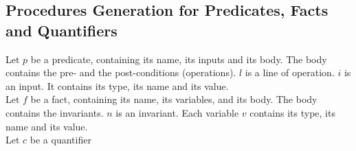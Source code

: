 \documentclass[oneside]{book}
\begin{document}
\newpage

\subsection{Procedures Generation for Predicates, Facts and Quantifiers}

Let $p$ be a predicate, containing its name, its inputs and its body. The body contains the pre- and the post-conditions (operations). $l$ is a line of operation. $i$ is an input. It contains its type, its name and its value.\\

Let $f$ be a fact, containing its name, its variables, and its body. The body contains the invariants. $n$ is an invariant. Each variable $v$ contains its type, its name and its value.\\

Let $c$ be a quantifier
\end{document}
